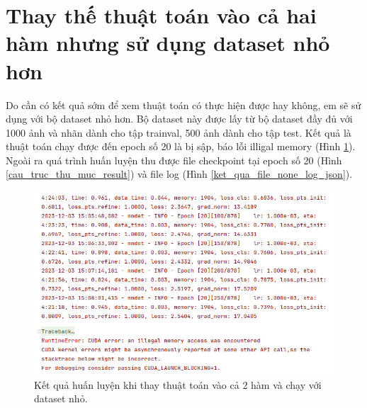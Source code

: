 \documentclass[12pt,a4paper,openany,oneside]{report}
\begin{document}
\section{Thay thế thuật toán vào cả hai hàm nhưng sử dụng dataset nhỏ hơn}
Do cần có kết quả sớm để xem thuật toán có thực hiện được hay không, em sẽ sử dụng với bộ dataset nhỏ hơn. Bộ dataset này được lấy từ bộ dataset đầy đủ với 1000 ảnh và nhãn dành cho tập trainval, 500 ảnh dành cho tập test. Kết quả là thuật toán chạy được đến epoch số 20 là bị sập, báo lỗi illigal memory (Hình \ref{mmrotate8_1000p_epoch20}). Ngoài ra quá trình huấn luyện thu được file checkpoint tại epoch số 20 (Hình \ref{cau_truc_thu_muc_result}) và file log (Hình \ref{ket_qua_file_none_log_json}).

\begin{figure}[ht!]
	\begin{center}
		\includegraphics[width=450px]{./mmrotate8_1000p_epoch20.JPG}
		\caption{Kết quả huấn luyện khi thay thuật toán vào cả 2 hàm và chạy với dataset nhỏ.}
		\label{mmrotate8_1000p_epoch20}
	\end{center}
\end{figure} 
\end{document}
